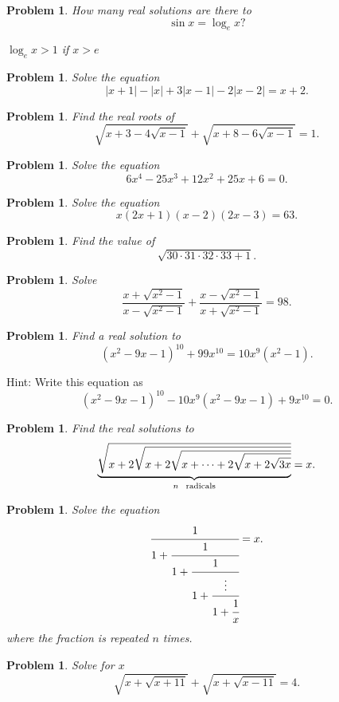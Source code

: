 \documentclass[11pt, openany]{book}
\theoremstyle{change} \theoremheaderfont{\blue\sffamily\bfseries}
\newtheorem{pro}[thm]{Problem}
\theoremstyle{nonumberplain} \theoremheaderfont{\sffamily\bfseries}
\newcommand{\í}{\'{\i}}
\begin{document}
\begin{multicols}{2}
\begin{pro} How many real solutions are there to
$$\sin x = \log_e x ?$$
\begin{answer} $\log_e x > 1$ if $x > e$\end{answer}
\end{pro}
\begin{pro} Solve the equation
$$|x + 1| - |x| + 3|x - 1| - 2|x - 2| = x + 2.$$\end{pro}
\begin{pro} Find the real roots of
$$\sqrt{x + 3 - 4\sqrt{x - 1}} + \sqrt{x + 8 - 6\sqrt{x - 1}} = 1.$$\end{pro}
\begin{pro} Solve the equation
$$6x^4  - 25x^3 + 12x^2 + 25x + 6 = 0.$$\end{pro}
\begin{pro} Solve the equation
$$x(2x + 1)(x - 2)(2x - 3) = 63.$$\end{pro}
\begin{pro}
Find the value of
$$\sqrt{30\cdot 31\cdot 32\cdot 33 + 1}.$$
\end{pro}
\begin{pro} Solve
$$\frac{x + \sqrt{x^2 - 1}}{x - \sqrt{x^2 - 1}} + \frac{x - \sqrt{x^2 - 1}}{x + \sqrt{x^2 - 1}} = 98.$$\end{pro}
\begin{pro} Find a real solution to
$$(x^2 - 9x - 1)^{10} + 99x^{10} = 10x^9(x^2 - 1).$$\end{pro}
Hint: Write this equation as
$$(x^2 - 9x - 1)^{10} - 10x^9(x^2 - 9x - 1) + 9x^{10} = 0.$$
\begin{pro} Find the real solutions to
$$\underbrace{\sqrt{x + 2\sqrt{x + 2\sqrt{x + \cdots + 2\sqrt{x + 2\sqrt{3x}}}} }}_{n \ {\rm \ radicals}} = x.$$
\end{pro}

\begin{pro}Solve the equation
$$\cfrac{1}{1 + \cfrac{1}{1 + \cfrac{1}{1 + \cfrac{\vdots}{1 + \cfrac{1}{x}}}}} = x.$$where the fraction is
repeated $n$ times.
\end{pro}
\begin{pro}
Solve for $x$
$$\sqrt{x + \sqrt{x + 11}} + \sqrt{x + \sqrt{x - 11}} = 4.$$
\end{pro}
\end{multicols}
\end{document}
